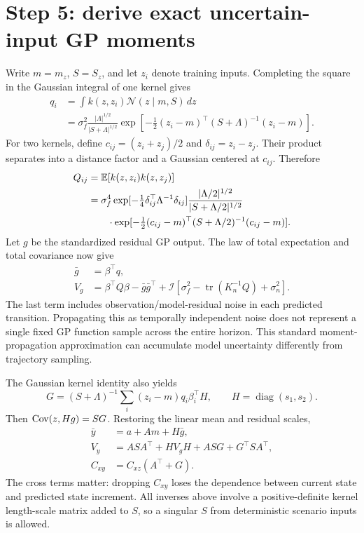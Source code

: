 \section{Step 5: derive exact uncertain-input GP moments}
Write $m=m_z$, $S=S_z$, and let $z_i$ denote training inputs. Completing the square in the Gaussian integral of one kernel gives
\begin{align}
 q_i&=\int k(z,z_i)\mathcal N(z\mid m,S)\,dz\\
 &=\sigma_f^2\frac{|\Lambda|^{1/2}}{|S+\Lambda|^{1/2}}
 \exp\left[-\tfrac12(z_i-m)^\top(S+\Lambda)^{-1}(z_i-m)\right].
\end{align}
For two kernels, define $c_{ij}=(z_i+z_j)/2$ and $\delta_{ij}=z_i-z_j$. Their product separates into a distance factor and a Gaussian centered at $c_{ij}$. Therefore
\begin{align}
 Q_{ij}&=\mathbb{E}[k(z,z_i)k(z,z_j)]\\
 &=\sigma_f^4\exp[-\tfrac14\delta_{ij}^\top\Lambda^{-1}\delta_{ij}]
 \frac{|\Lambda/2|^{1/2}}{|S+\Lambda/2|^{1/2}}\nonumber\\
 &\hspace{7mm}\cdot\exp[-\tfrac12(c_{ij}-m)^\top(S+\Lambda/2)^{-1}(c_{ij}-m)].
\end{align}
Let $g$ be the standardized residual GP output. The law of total expectation and total covariance now give
\begin{align}
 \bar g&=\beta^\top q,\\
 V_g&=\beta^\top Q\beta-\bar g\bar g^\top+
 \mathcal I\left[\sigma_f^2-\operatorname{tr}(K_n^{-1}Q)+\sigma_n^2\right].
\end{align}
The last term includes observation/model-residual noise in each predicted transition. Propagating this as temporally independent noise does not represent a single fixed GP function sample across the entire horizon. This standard moment-propagation approximation can accumulate model uncertainty differently from trajectory sampling.

The Gaussian kernel identity also yields
\begin{equation}
 G=(S+\Lambda)^{-1}\sum_i(z_i-m)q_i\beta_i^\top H,
 \qquad H=\operatorname{diag}(s_1,s_2).
\end{equation}
Then $\operatorname{Cov}(z,Hg)=SG$. Restoring the linear mean and residual scales,
\begin{align}
 \bar y&=a+Am+H\bar g,\\
 V_y&=ASA^\top+HV_gH+ASG+G^\top SA^\top,\\
 C_{xy}&=C_{xz}(A^\top+G).
\end{align}
The cross terms matter: dropping $C_{xy}$ loses the dependence between current state and predicted state increment. All inverses above involve a positive-definite kernel length-scale matrix added to $S$, so a singular $S$ from deterministic scenario inputs is allowed.

